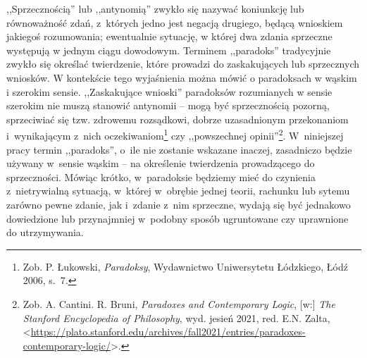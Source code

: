 ,,Sprzecznością'' lub ,,antynomią'' zwykło się nazywać koniunkcję lub równoważność zdań, z~których jedno jest negacją drugiego, będącą wnioskiem jakiegoś rozumowania; ewentualnie sytuację, w której dwa zdania sprzeczne występują w jednym ciągu dowodowym.
Terminem ,,paradoks'' tradycyjnie zwykło się określać twierdzenie, które prowadzi do zaskakujących lub sprzecznych wniosków.
W kontekście tego wyjaśnienia można mówić o paradoksach w wąskim i szerokim sensie.
,,Zaskakujące wnioski'' paradoksów rozumianych w sensie szerokim nie muszą stanowić antynomii -- mogą być sprzecznością pozorną,
sprzeciwiać się tzw. zdrowemu rozsądkowi,
dobrze uzasadnionym przekonaniom i~wynikającym z~nich oczekiwaniom\footnote{Zob. P. Łukowski, \textit{Paradoksy}, Wydawnictwo Uniwersytetu Łódzkiego, Łódź 2006, s.~7.}
czy ,,powszechnej opinii''\footnote{Zob. A. Cantini. R. Bruni, \textit{Paradoxes and Contemporary Logic}, [w:] \textit{The Stanford Encyclopedia of Philosophy}, wyd. jesień 2021, red. E.N. Zalta, {\textless}\url{https://plato.stanford.edu/archives/fall2021/entries/paradoxes-contemporary-logic/}{\textgreater}.}.
W~niniejszej pracy termin ,,paradoks'', o~ile nie zostanie wskazane inaczej, zasadniczo będzie używany w~sensie wąskim -- na określenie twierdzenia prowadzącego do sprzeczności.
Mówiąc krótko, w~paradoksie będziemy mieć do czynienia z~nietrywialną sytuacją, w~której w~obrębie jednej teorii, rachunku lub sytemu zarówno pewne zdanie, jak i~zdanie z~nim sprzeczne, wydają się być jednakowo dowiedzione lub przynajmniej w~podobny sposób ugruntowane czy uprawnione do utrzymywania.

